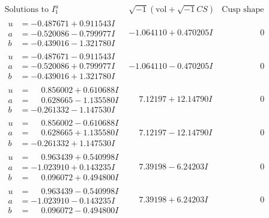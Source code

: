 \documentclass[1p]{elsarticle_modified}
\theoremstyle{definition}
\newcommand{\I}{\sqrt{-1}}
\begin{document}
$$\begin{array}{c|c|c}  
\text{Solutions to }I^u_{1}& \I (\text{vol} + \sqrt{-1}CS) & \text{Cusp shape}\\
 \hline 
\begin{aligned}
u &= -0.487671 + 0.911543 I \\
a &= -0.520086 - 0.799977 I \\
b &= -0.439016 - 1.321780 I\end{aligned}
 & -1.064110 + 0.470205 I & \phantom{-0.000000 } 0 \\ \hline\begin{aligned}
u &= -0.487671 - 0.911543 I \\
a &= -0.520086 + 0.799977 I \\
b &= -0.439016 + 1.321780 I\end{aligned}
 & -1.064110 - 0.470205 I & \phantom{-0.000000 } 0 \\ \hline\begin{aligned}
u &= \phantom{-}0.856002 + 0.610688 I \\
a &= \phantom{-}0.628665 - 1.135580 I \\
b &= -0.261332 - 1.147530 I\end{aligned}
 & \phantom{-}7.12197 + 12.14790 I & \phantom{-0.000000 } 0 \\ \hline\begin{aligned}
u &= \phantom{-}0.856002 - 0.610688 I \\
a &= \phantom{-}0.628665 + 1.135580 I \\
b &= -0.261332 + 1.147530 I\end{aligned}
 & \phantom{-}7.12197 - 12.14790 I & \phantom{-0.000000 } 0 \\ \hline\begin{aligned}
u &= \phantom{-}0.963439 + 0.540998 I \\
a &= -1.023910 + 0.143235 I \\
b &= \phantom{-}0.096072 + 0.494800 I\end{aligned}
 & \phantom{-}7.39198 - 6.24203 I & \phantom{-0.000000 } 0 \\ \hline\begin{aligned}
u &= \phantom{-}0.963439 - 0.540998 I \\
a &= -1.023910 - 0.143235 I \\
b &= \phantom{-}0.096072 - 0.494800 I\end{aligned}
 & \phantom{-}7.39198 + 6.24203 I & \phantom{-0.000000 } 0 \\ \hline\begin{aligned}

\end{aligned}
\end{array}$$
\end{document}
